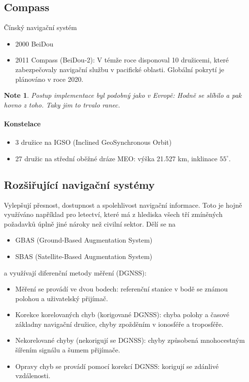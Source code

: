 \documentclass[11pt,a4paper]{article}
\theoremstyle{my-theorem}
\theoremstyle{non-theorem}
\newtheorem{note}[theorem]{Note}
\begin{document}
\subsection{Compass}
Čínský navigační systém
\begin{itemize}
    \item 2000 BeiDou
    \item 2011 Compass (BeiDou-2): V témže roce disponoval 10 družicemi, které zabezpečovaly navigační službu v pacifické oblasti. Globální pokrytí je plánováno v roce 2020.
\end{itemize}
\begin{note}
    Postup implementace byl podobný jako v Evropě: Hodně se slíbilo a pak hovno z toho. Taky jim to trvalo ranec.
\end{note}
\paragraph*{Konstelace}
\begin{itemize}
    \item 3 družice na IGSO (Inclined GeoSynchronous Orbit)
    \item 27 družic na střední oběžné dráze MEO: výška 21.527 km, inklinace $55^\circ$.
\end{itemize}

\subsection{Rozšiřující navigační systémy}
Vylepšují přesnost, dostupnost a spolehlivost navigační informace. Toto je hojně využíváno například pro letectví, které má z hlediska všech tří zmíněných požadavků úplně jiné nároky než civilní sektor. Dělí se na
\begin{itemize}
    \item GBAS (Ground-Based Augmentation System)
    \item SBAS (Satellite-Based Augmentation System)
\end{itemize}
a využívají diferenční metody měření (DGNSS):
\begin{itemize}
    \item Měření se provádí ve dvou bodech: referenční stanice v bodě se známou polohou a uživatelský přijímač.
    \item Korekce korelovaných chyb (korigované DGNSS): chyba polohy a časové základny navigační družice, chyby zpožděním v ionosféře a troposféře.
    \item Nekorelované chyby (nekorigují se DGNSS): chyby způsobená mnohocestným šířením signálu a šumem přijímače.
    \item Opravy chyb se provádí pomocí korekcí DGNSS: korigují se zdánlivé vzdálenosti.
\end{itemize}
\end{document}

